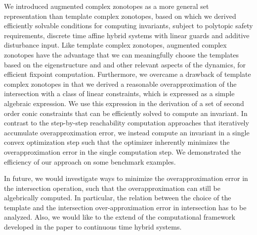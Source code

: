 We introduced augmented complex zonotopes as a more general set
representation than template complex zonotopes, based on which we
derived efficiently solvable conditions for computing invariants,
subject to polytopic safety requirements, discrete time affine hybrid
systems with linear guards and additive disturbance input.  Like
template complex zonotopes, augmented complex zonotopes have the
advantage that we can meaningfully choose the templates based on the
eigenstructure and and other relevant aspects of the dynamics, for
efficient fixpoint computation.  Furthermore, we overcame a drawback
of template complex zonotopes in that we derived a reasonable
overapproximation of the intersection with a class of linear
constraints, which is expressed as a simple algebraic expression.  We
use this expression in the derivation of a set of second order conic
constraints that can be efficiently solved to compute an invariant.
In contrast to the step-by-step reachability computation approaches
that iteratively accumulate overapproximation error, we
instead compute an invariant in a single convex optimization step such
that the optimizer inherently minimizes the overapproximation error in
the single computation step.  We demonstrated the efficiency of our
approach on some benchmark examples.

In future, we would investigate ways to minimize the overapproximation
error in the intersection operation, such that the overapproximation
can still be algebrically computed.  In particular, the relation
between the choice of the template and the intersection
over-approximation error in intersection has to be analyzed.  Also, we
would like to the extend of the computational framework developed in
the paper to continuous time hybrid systems.
